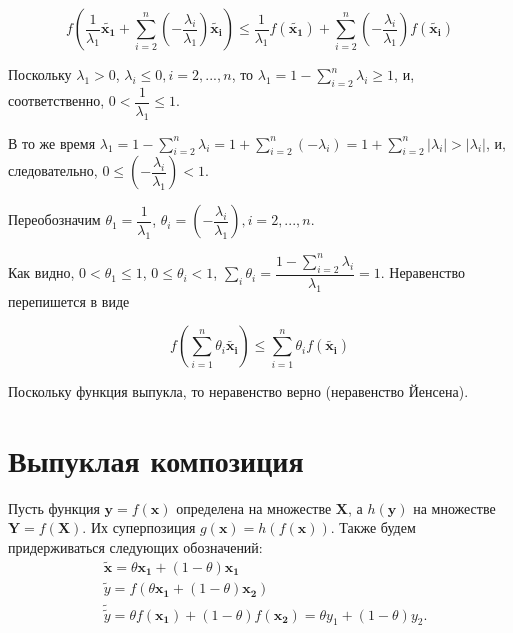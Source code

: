 	\begin{equation}
	f(\frac{1}{\lambda_1}\mathbf{\tilde{x_1}}  + \sum\limits_{i=2}^{n}
	(-\frac{\lambda_i}{\lambda_1} )  \mathbf{\tilde{x_i}})  \leqslant
	\frac{1}{\lambda_1}f(\mathbf{\tilde{x_1}})  + \sum\limits_{i=2}^{n}
	(-\frac{\lambda_i}{\lambda_1} )  f(\mathbf{\tilde{x_i}})
	\end{equation}
	
	Поскольку $\lambda_1 > 0$, $\lambda_i \leqslant 0, i=2,...,n$, то $\lambda_1 =
	1 - \sum\limits_{i=2}^{n}\lambda_i \geqslant 1$, и, соответственно, $0 <
	\dfrac{1}{\lambda_1} \leqslant 1$. 
	
	В то же время $\lambda_1 = 1 - \sum\limits_{i=2}^{n}\lambda_i = 1 +
	\sum\limits_{i=2}^{n}(-\lambda_i) = 1 + \sum\limits_{i=2}^{n}\left|
	\lambda_i\right| > \left| \lambda_i\right|$, и, следовательно, $0 \leqslant
	(-\dfrac{\lambda_i}{\lambda_1}) < 1$.
	
	Переобозначим $\theta_1 = \dfrac{1}{\lambda_1}$, $\theta_i =
	(-\dfrac{\lambda_i}{\lambda_1}), i=2,...,n$. 
	
	Как видно, $0<\theta_1 \leqslant 1$, $0 \leqslant \theta_i < 1$, $\sum\limits_i
	\theta_i = \dfrac{1 - \sum\limits_{i=2}^{n}\lambda_i}{\lambda_1}=1$. Неравенство
	перепишется в виде
	
	\begin{equation}
	f( \sum\limits_{i=1}^{n} \theta_i \mathbf{\tilde{x_i}})  \leqslant
	\sum\limits_{i=1}^{n} \theta_i  f(\mathbf{\tilde{x_i}})
	\end{equation}
	
	Поскольку функция выпукла, то неравенство верно (неравенство Йенсена).
	
	\section{Выпуклая композиция}
	
	Пусть функция $\mathbf{y} = f(\mathbf{x})$ определена на множестве
	$\mathbf{X}$, а $h(\mathbf{y})$ на множестве $\mathbf{Y} = f(\mathbf{X})$. Их суперпозиция $g(\mathbf{x}) = h(f(\mathbf{x}))$. Также
	будем придерживаться следующих обозначений:
	\begin{equation}
	\begin{split}
	 &\mathbf{\tilde{x}} = \theta
	\mathbf{x_1} + (1-\theta )\mathbf{x_1}\\
	&\tilde{y} = f(\theta \mathbf{x_1} +
	(1-\theta )\mathbf{x_2})\\
	 &\tilde{\tilde{y}} = \theta  f(\mathbf{x_1})
	+ (1-\theta )f(\mathbf{x_2}) =\theta  y_1 + (1-\theta )y_2  . 
	\end{split}
	\end{equation}
	
